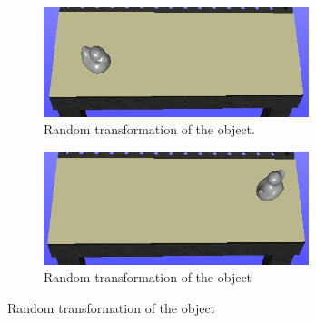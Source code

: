\documentclass[../main.tex]{subfiles}
\begin{document}
\begin{figure}[H]
    \centering
    \begin{subfigure}[t]{0.4\textwidth}
        \centering
        \captionsetup{width=0.85\textwidth}
        \includegraphics[width=0.85\textwidth]{figures/simulated_depth_sensor/analysis_ex1.png}
        \caption{Random transformation of the object.}
        \label{subfig:rand_pos1}
    \end{subfigure}
    \begin{subfigure}[t]{0.4\textwidth}
        \centering
        \captionsetup{width=0.85\textwidth}
        \includegraphics[width=0.85\textwidth]{figures/simulated_depth_sensor/analysis_ex2.png}
        \caption{Random transformation of the object}
        \label{subfig:rand_pos2}
    \end{subfigure}
    

\end{figure}
\end{document}

